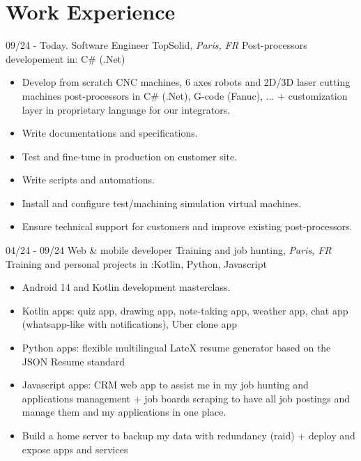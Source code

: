 \documentclass[]{friggeri-cv}
\begin{document}
\section{Work Experience}
\vspace*{-0.25cm}

\begin{entrylist}
  \entry
    {09/24 - Today.}
    {Software Engineer}
    {TopSolid, \textit{Paris, FR}}
    {Post-processors developement in: C\# (.Net)}
\end{entrylist}
\vspace{-15pt}

\vspace{0.5mm}
\begin{itemize}
\setlength{\itemsep}{1pt}
\setlength{\parskip}{0pt}
\setlength{\parsep}{0pt}

\item Develop from scratch CNC machines, 6 axes robots and 2D/3D laser cutting machines post-processors in C\# (.Net), G-code (Fanuc), ... + customization layer in proprietary language for our integrators.
\item Write documentations and specifications.
\item Test and fine-tune in production on customer site.
\item Write scripts and automations.
\item Install and configure test/machining simulation virtual machines.
\item Ensure technical support for customers and improve existing post-processors.
\end{itemize}

\begin{entrylist}
  \entry
    {04/24 - 09/24}
    {Web \& mobile developer}
    {Training and job hunting, \textit{Paris, FR}}
    {Training and personal projects in :\hspace*{8mm}Kotlin, Python, Javascript}
\end{entrylist}
\vspace{-15pt}

\vspace{0.5mm}
\begin{itemize}
\setlength{\itemsep}{1pt}
\setlength{\parskip}{0pt}
\setlength{\parsep}{0pt}

\item Android 14 and Kotlin development masterclass.
\item Kotlin apps: quiz app, drawing app, note-taking app, weather app, chat app (whatsapp-like with notifications), Uber clone app
\item Python apps: flexible multilingual LateX resume generator based on the JSON Resume standard
\item Javascript apps: CRM web app to assist me in my job hunting and applications management + job boards scraping to have all job postings and manage them and my applications in one place.
\item Build a home server to backup my data with redundancy (raid) + deploy and expose apps and services
\end{itemize}
\end{document}
